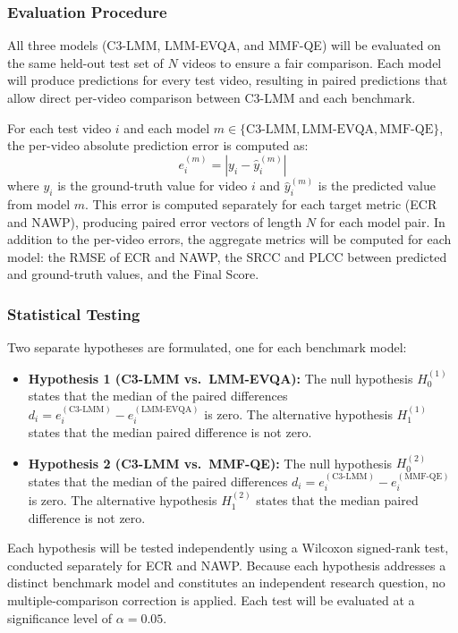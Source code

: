 \subsubsection{Evaluation Procedure}

All three models (C3-LMM, LMM-EVQA, and MMF-QE) will be evaluated on the same held-out test set of $N$ videos to ensure a fair comparison. Each model will produce predictions for every test video, resulting in paired predictions that allow direct per-video comparison between C3-LMM and each benchmark.

For each test video $i$ and each model $m \in \{\text{C3-LMM}, \text{LMM-EVQA}, \text{MMF-QE}\}$, the per-video absolute prediction error is computed as:
\begin{equation}
    e_i^{(m)} = |y_i - \hat{y}_i^{(m)}|
\end{equation}
where $y_i$ is the ground-truth value for video $i$ and $\hat{y}_i^{(m)}$ is the predicted value from model $m$. This error is computed separately for each target metric (ECR and NAWP), producing paired error vectors of length $N$ for each model pair.
In addition to the per-video errors, the aggregate metrics will be computed for each model: the RMSE of ECR and NAWP, the SRCC and PLCC between predicted and ground-truth values, and the Final Score.

\subsubsection{Statistical Testing}

Two separate hypotheses are formulated, one for each benchmark model:
\begin{itemize}
    \item \textbf{Hypothesis 1 (C3-LMM vs.\ LMM-EVQA):} The null hypothesis $H_0^{(1)}$ states that the median of the paired differences $d_i = e_i^{(\text{C3-LMM})} - e_i^{(\text{LMM-EVQA})}$ is zero. The alternative hypothesis $H_1^{(1)}$ states that the median paired difference is not zero.
    \item \textbf{Hypothesis 2 (C3-LMM vs.\ MMF-QE):} The null hypothesis $H_0^{(2)}$ states that the median of the paired differences $d_i = e_i^{(\text{C3-LMM})} - e_i^{(\text{MMF-QE})}$ is zero. The alternative hypothesis $H_1^{(2)}$ states that the median paired difference is not zero.
\end{itemize}
Each hypothesis will be tested independently using a Wilcoxon signed-rank test, conducted separately for ECR and NAWP. Because each hypothesis addresses a distinct benchmark model and constitutes an independent research question, no multiple-comparison correction is applied. Each test will be evaluated at a significance level of $\alpha = 0.05$.

